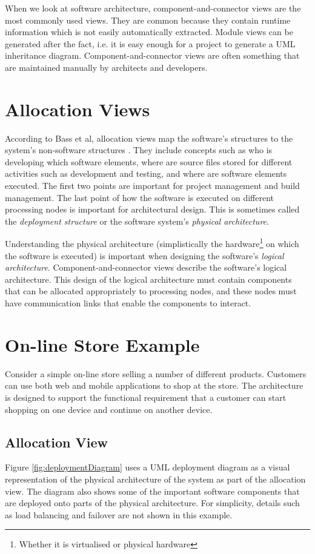 When we look at software architecture, component-and-connector views are the most commonly used views.
They are common because they contain runtime information which is not easily automatically extracted.
Module views can be generated after the fact, i.e. it is easy enough for a project to generate a UML inheritance diagram.
Component-and-connector views are often something that are maintained manually by architects and developers.

\section{Allocation Views}
According to Bass et al, allocation views map the software's structures to the system's non-software structures \cite{bass2021software}.
They include concepts such as who is developing which software elements,
where are source files stored for different activities such as development and testing,
and where are software elements executed.
The first two points are important for project management and build management.
The last point of how the software is executed on different processing nodes is important for architectural design.
This is sometimes called the \emph{deployment structure} or the software system's \emph{physical architecture}.

Understanding the physical architecture (simplistically the hardware\footnote{Whether it is virtualised or physical hardware}
on which the software is executed) is important when designing the software's \emph{logical architecture}.
Component-and-connector views describe the software's logical architecture.
This design of the logical architecture must contain components that can be allocated appropriately to processing nodes,
and these nodes must have communication links that enable the components to interact.

\section{On-line Store Example}\label{sec:storeExample}
Consider a simple on-line store selling a number of different products. Customers can use both web and mobile applications to shop at the store.
The architecture is designed to support the functional requirement that a customer can start shopping on one device and continue on another device.

\subsection{Allocation View}\label{sec:storeAllocView}
Figure \ref{fig:deploymentDiagram} uses a UML deployment diagram as a visual representation of the physical architecture of the system as part of the allocation view.
The diagram also shows some of the important software components that are deployed onto parts of the physical architecture.
For simplicity, details such as load balancing and failover are not shown in this example.

